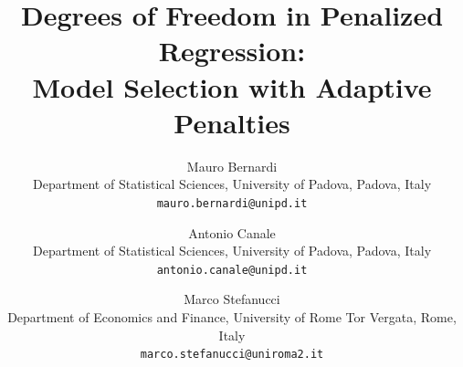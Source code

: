 \documentclass[a4paper, 12pt]{article}
\begin{document}
\title{\LARGE \textbf{Degrees of Freedom in Penalized Regression:\\ Model Selection with Adaptive Penalties}} %

\author{
  Mauro Bernardi\\
  \small{Department of Statistical Sciences, University of Padova, Padova, Italy}\\
  \small{\texttt{mauro.bernardi@unipd.it}}
  \and
  Antonio Canale\\
  \small{Department of Statistical Sciences, University of Padova, Padova, Italy}\\
  \small{\texttt{antonio.canale@unipd.it}}
  \and
  Marco Stefanucci\\
  \small{Department of Economics and Finance, University of Rome Tor Vergata, Rome, Italy}\\
  \small{\texttt{marco.stefanucci@uniroma2.it}}
}

\date{}

\maketitle
\end{document}
